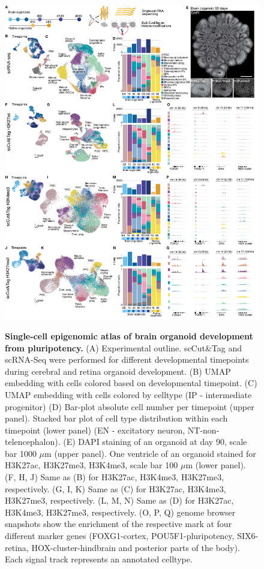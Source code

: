 \begin{figure}[b!]
    \centering
	\includegraphics[width=\textwidth]{figures/cnt/Figure_1}
    \label{fig:cnt1}
\end{figure}

\begin{figure}[t!]
    \caption{\textbf{Single-cell epigenomic atlas of brain organoid development from pluripotency.}
    (A) Experimental outline. scCut\&Tag and scRNA-Seq were performed for different developmental timepoints during cerebral and retina organoid development. (B) UMAP embedding with cells colored based on developmental timepoint. (C) UMAP embedding with cells colored by celltype (IP - intermediate progenitor) (D) Bar-plot absolute cell number per timepoint (upper panel). Stacked bar plot of cell type distribution within each timepoint (lower panel) (EN - excitatory neuron, NT-non-telencephalon). (E) DAPI staining of an organoid at day 90, scale bar 1000 $\mu$m (upper panel). One ventricle of an organoid stained for H3K27ac, H3K27me3, H3K4me3, scale bar 100 $\mu$m (lower panel). (F, H, J) Same as (B) for H3K27ac, H3K4me3, H3K27me3, respectively. (G, I, K) Same as (C) for H3K27ac, H3K4me3, H3K27me3, respectively. (L, M, N) Same as (D) for H3K27ac, H3K4me3, H3K27me3, respectively. (O, P, Q) genome browser snapshots show the enrichment of the respective mark at four different marker genes (FOXG1-cortex, POU5F1-pluripotency, SIX6-retina, HOX-cluster-hindbrain and posterior parts of the body). Each signal track represents an annotated celltype.}
\end{figure}

